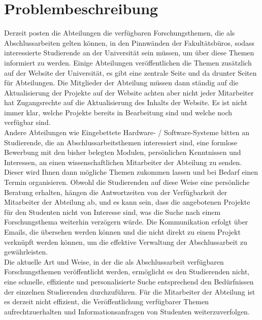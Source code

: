 \section{Problembeschreibung}
Derzeit posten die Abteilungen die verfügbaren Forschungsthemen, die als Abschlussarbeiten gelten können, in den Pinnwänden der Fakultätsbüros, sodass interessierte Studierende an der Universität sein müssen, um über diese Themen informiert zu werden.
Einige Abteilungen veröffentlichen die Themen zusätzlich auf der Website der Universität, es gibt eine zentrale Seite und da drunter Seiten für Abteilungen. Die Mitglieder der Abteilung müssen dann ständig auf die Aktualisierung der Projekte auf der Website achten aber nicht jeder Mitarbeiter hat Zugangsrechte auf die Aktualisierung des Inhalts der Website. Es ist nicht immer klar, welche Projekte bereits in Bearbeitung sind und welche noch verfügbar sind.\\

Andere Abteilungen wie Eingebettete Hardware- / Software-Systeme bitten an Studierende, die an Abschlussarbeitsthemen interessiert sind, eine formlose Bewerbung mit   den bisher belegten Modulen, persönlichen Kenntnissen und Interessen, an einen wissenschaftlichen Mitarbeiter der Abteilung zu senden. Dieser wird Ihnen dann mögliche Themen zukommen lassen und bei Bedarf einen Termin organisieren\cite{EHS:2020}.
Obwohl die Studierenden auf diese Weise eine persönliche Beratung erhalten, hängen die Antwortzeiten von der Verfügbarkeit der Mitarbeiter der Abteilung ab, und es kann sein, dass die angebotenen Projekte für den Studenten nicht von Interesse sind, was die Suche nach einem Forschungsthema weiterhin verzögern würde. Die Kommunikation erfolgt über Emails, die übersehen werden können und die nicht direkt zu einem Projekt verknüpft werden können, um die effektive Verwaltung der Abschlussarbeit zu gewährleisten.\\

Die aktuelle Art und Weise, in der die als Abschlussarbeit verfügbaren Forschungsthemen veröffentlicht werden, ermöglicht es den Studierenden nicht, eine schnelle, effiziente und personalisierte Suche entsprechend den Bedürfnissen der einzelnen Studierenden durchzuführen. Für die Mitarbeiter der Abteilung ist es derzeit nicht effizient, die Veröffentlichung verfügbarer Themen aufrechtzuerhalten und Informationsanfragen von Studenten weiterzuverfolgen.